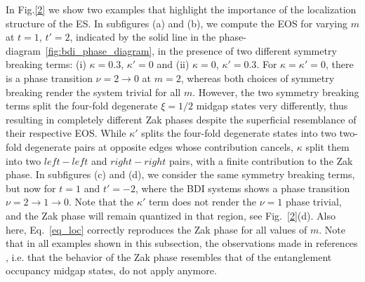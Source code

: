 \documentclass[twocolumn,amsmath,longbibliography,amssymb,superscriptaddress]{revtex4-1}
\begin{document}
In Fig.\ref{2} we show two examples that highlight the importance of the localization structure of the ES. 
In subfigures (a) and (b), we compute the EOS for varying $m$ at  $t=1$, $t'=2$, indicated by the solid line  in the phase-diagram~\ref{fig:bdi_phase_diagram}, in the presence of two different symmetry breaking terms: (i) $\kappa =0.3$, $\kappa'=0$ and (ii) $\kappa=0$, $\kappa'=0.3$.  
For $\kappa=\kappa'=0$, there is a phase transition $\nu = 2 \rightarrow 0 $ at $m=2$, whereas both choices of symmetry breaking render the system trivial  for all $m$.
However, the two symmetry breaking terms split the four-fold degenerate $\xi=1/2$ midgap states very differently, thus resulting in completely different Zak phases despite the superficial resemblance of their respective EOS.  
While $\kappa'$ splits the four-fold degenerate states into two two-fold degenerate pairs at opposite edges whose contribution cancels, $\kappa$ split them into two $left-left$ and $right-right$ pairs, with a finite contribution to the Zak phase. 
In subfigures (c) and (d), we consider the same symmetry breaking terms, but now for $t=1$ and $t'=-2$, where the BDI systems shows a phase transition  $\nu=2\rightarrow 1\rightarrow 0$. 
Note that the $\kappa'$ term does not render the $\nu=1$ phase trivial, and the Zak phase will remain quantized in that region, see Fig.~\ref{2}(d). 
Also here, Eq.~\ref{eq_loc} correctly reproduces the Zak phase for all values of $m$. 
Note that in all examples shown in this subsection, the observations made in references \cite{Huang2012,Huang2012-2}, i.e. that the behavior of the Zak phase resembles that of the entanglement occupancy midgap states, do not apply anymore. 
\end{document}

